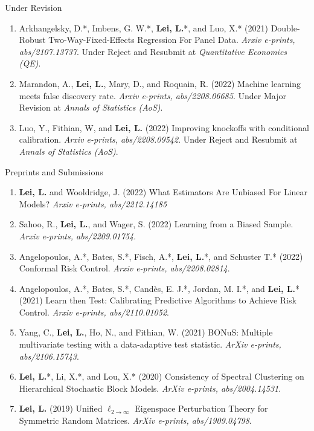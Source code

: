 \documentclass{article}
\begin{document}
\begin{large}
\noindent Under Revision
\end{large}

\begin{enumerate}
\item Arkhangelsky, D.*, Imbens, G. W.*, \textbf{Lei, L.}*, and Luo, X.* (2021) Double-Robust Two-Way-Fixed-Effects Regression For Panel Data. \emph{Arxiv e-prints, abs/2107.13737}. Under Reject and Resubmit at \emph{Quantitative Economics (QE)}.
\item Marandon, A., \textbf{Lei, L.}, Mary, D., and Roquain, R. (2022) Machine learning meets false discovery rate. \emph{Arxiv e-prints, abs/2208.06685}. Under Major Revision at \emph{Annals of Statistics (AoS)}.
\item Luo, Y., Fithian, W, and \textbf{Lei, L.} (2022) Improving knockoffs with conditional calibration. \emph{Arxiv e-prints, abs/2208.09542}. Under Reject and Resubmit at \emph{Annals of Statistics (AoS)}.
\end{enumerate}

\begin{large}
\noindent Preprints and Submissions
\end{large}

\begin{enumerate}
\item \textbf{Lei, L.} and Wooldridge, J. (2022) What Estimators Are Unbiased For Linear Models? \emph{Arxiv e-prints, abs/2212.14185}
\item Sahoo, R., \textbf{Lei, L.}, and Wager, S. (2022) Learning from a Biased Sample. \emph{Arxiv e-prints, abs/2209.01754}.
\item Angelopoulos, A.*, Bates, S.*, Fisch, A.*, \textbf{Lei, L.}*, and Schuster T.* (2022) Conformal Risk Control. \emph{Arxiv e-prints, abs/2208.02814}.
\item Angelopoulos, A.*, Bates, S.*, Cand\`{e}s, E. J.*, Jordan, M. I.*, and \textbf{Lei, L.}* (2021) Learn then Test: Calibrating Predictive Algorithms to Achieve Risk Control. \emph{Arxiv e-prints, abs/2110.01052}.
\item Yang, C., \textbf{Lei, L.}, Ho, N., and Fithian, W. (2021) BONuS: Multiple multivariate testing with a data-adaptive test statistic. \emph{ArXiv e-prints, abs/2106.15743}.
\item \textbf{Lei, L.}*, Li, X.*, and Lou, X.* (2020) Consistency of Spectral Clustering on Hierarchical Stochastic Block Models. \emph{ArXiv e-prints, abs/2004.14531}.
\item \textbf{Lei, L.} (2019) Unified $\ell_{2\rightarrow\infty}$ Eigenspace Perturbation Theory for Symmetric Random Matrices. \emph{ArXiv e-prints, abs/1909.04798}.
\end{enumerate}
\end{document}
